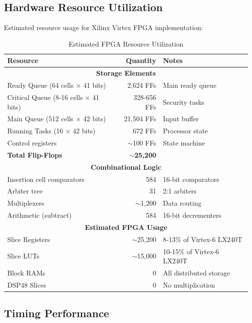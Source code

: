 \documentclass[12pt,a4paper]{article}
\begin{document}
\subsection{Hardware Resource Utilization}

Estimated resource usage for Xilinx Virtex FPGA implementation:

\begin{table}[H]
\centering
\begin{tabular}{|l|r|l|}
\hline
\textbf{Resource} & \textbf{Quantity} & \textbf{Notes} \\
\hline
\multicolumn{3}{|c|}{\textbf{Storage Elements}} \\
\hline
Ready Queue (64 cells × 41 bits) & 2,624 FFs & Main ready queue \\
Critical Queue (8-16 cells × 41 bits) & 328-656 FFs & Security tasks \\
Main Queue (512 cells × 42 bits) & 21,504 FFs & Input buffer \\
Running Tasks (16 × 42 bits) & 672 FFs & Processor state \\
Control registers & $\sim$100 FFs & State machine \\
\textbf{Total Flip-Flops} & \textbf{$\sim$25,200} & \\
\hline
\multicolumn{3}{|c|}{\textbf{Combinational Logic}} \\
\hline
Insertion cell comparators & 584 & 16-bit comparators \\
Arbiter tree & 31 & 2:1 arbiters \\
Multiplexers & $\sim$1,200 & Data routing \\
Arithmetic (subtract) & 584 & 16-bit decrementers \\
\hline
\multicolumn{3}{|c|}{\textbf{Estimated FPGA Usage}} \\
\hline
Slice Registers & $\sim$25,200 & 8-13\% of Virtex-6 LX240T \\
Slice LUTs & $\sim$15,000 & 10-15\% of Virtex-6 LX240T \\
Block RAMs & 0 & All distributed storage \\
DSP48 Slices & 0 & No multiplication \\
\hline
\end{tabular}
\caption{Estimated FPGA Resource Utilization}
\label{tab:resources}
\end{table}

\subsection{Timing Performance}
\end{document}

